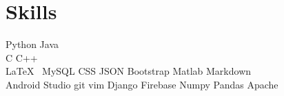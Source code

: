 
\section{Skills}
Python \textbullet{}   Java \\
C \textbullet{} C++ \\
\LaTeX\ \textbullet{} MySQL \textbullet{} CSS \textbullet{} JSON \textbullet{} Bootstrap \textbullet{} Matlab \textbullet{} Markdown \\

Android Studio  \textbullet{} git \textbullet{} vim \textbullet{} Django \textbullet{} Firebase \textbullet{} Numpy \textbullet{} Pandas \textbullet{} Apache
\sectionsep